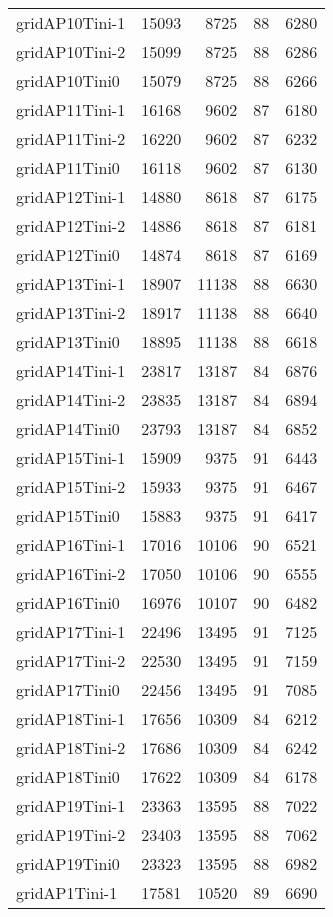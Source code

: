 \documentclass[../../../thesis.tex]{subfiles}
\begin{document}
\begin{longtable}{lrrrr}
gridAP10Tini-1 & 15093 & 8725 & 88 & 6280 \\
gridAP10Tini-2 & 15099 & 8725 & 88 & 6286 \\
gridAP10Tini0 & 15079 & 8725 & 88 & 6266 \\
gridAP11Tini-1 & 16168 & 9602 & 87 & 6180 \\
gridAP11Tini-2 & 16220 & 9602 & 87 & 6232 \\
gridAP11Tini0 & 16118 & 9602 & 87 & 6130 \\
gridAP12Tini-1 & 14880 & 8618 & 87 & 6175 \\
gridAP12Tini-2 & 14886 & 8618 & 87 & 6181 \\
gridAP12Tini0 & 14874 & 8618 & 87 & 6169 \\
gridAP13Tini-1 & 18907 & 11138 & 88 & 6630 \\
gridAP13Tini-2 & 18917 & 11138 & 88 & 6640 \\
gridAP13Tini0 & 18895 & 11138 & 88 & 6618 \\
gridAP14Tini-1 & 23817 & 13187 & 84 & 6876 \\
gridAP14Tini-2 & 23835 & 13187 & 84 & 6894 \\
gridAP14Tini0 & 23793 & 13187 & 84 & 6852 \\
gridAP15Tini-1 & 15909 & 9375 & 91 & 6443 \\
gridAP15Tini-2 & 15933 & 9375 & 91 & 6467 \\
gridAP15Tini0 & 15883 & 9375 & 91 & 6417 \\
gridAP16Tini-1 & 17016 & 10106 & 90 & 6521 \\
gridAP16Tini-2 & 17050 & 10106 & 90 & 6555 \\
gridAP16Tini0 & 16976 & 10107 & 90 & 6482 \\
gridAP17Tini-1 & 22496 & 13495 & 91 & 7125 \\
gridAP17Tini-2 & 22530 & 13495 & 91 & 7159 \\
gridAP17Tini0 & 22456 & 13495 & 91 & 7085 \\
gridAP18Tini-1 & 17656 & 10309 & 84 & 6212 \\
gridAP18Tini-2 & 17686 & 10309 & 84 & 6242 \\
gridAP18Tini0 & 17622 & 10309 & 84 & 6178 \\
gridAP19Tini-1 & 23363 & 13595 & 88 & 7022 \\
gridAP19Tini-2 & 23403 & 13595 & 88 & 7062 \\
gridAP19Tini0 & 23323 & 13595 & 88 & 6982 \\
gridAP1Tini-1 & 17581 & 10520 & 89 & 6690 \\

\end{longtable}
\end{document}
